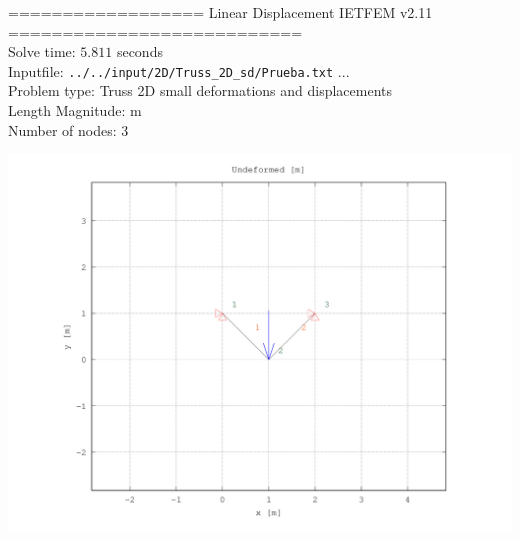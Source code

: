 \documentclass[a4paper,11pt]{article}
\begin{document}

================== Linear Displacement IETFEM v2.11 ===========================\\


Solve time: $ 5.811$ seconds \\

Inputfile: \verb|../../input/2D/Truss_2D_sd/Prueba.txt|  ... \\

Problem type: Truss 2D small deformations and displacements\\ 

Length Magnitude: m \\

Number of nodes: 3 \\

\newpage       

\begin{center}       
\includegraphics[width=.80\textwidth]{../../Prueba_undeformed.png}    
  \end{center}       
\end{document}
